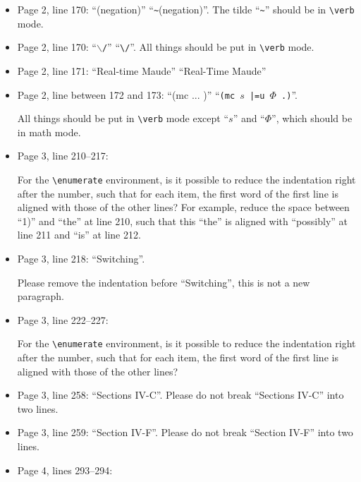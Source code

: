 \documentclass[12pt,onecolumn]{IEEEtranTIE}
\begin{document}
\begin{itemize}
All things should be put in \verb|\verb| mode except ``$s$'' and
``$\mathit{prop}$'', which should be in math mode. And please use the
macro \verb|\mathit{}| for ``$\mathit{prop}$''.

\item Page 2, line 170: ``(negation)'' \by ``\verb|~|(negation)''. The
  tilde ``\verb|~|'' should be in \verb|\verb| mode.

\item Page 2, line 170: ``$\backslash$\verb|/|'' \by ``\verb|\/|''. All
  things should be put in \verb|\verb| mode.

\item Page 2, line 171: ``Real-time Maude'' \by ``Real-Time Maude''

\item Page 2, line between 172 and 173: ``(mc ... )'' \by
  ``\verb|(mc |$s$\verb+ |=u +$\Phi$\verb| .)|''.

All things should be put in \verb|\verb| mode except ``$s$'' and
``$\Phi$'', which should be in math mode.

\item Page 3, line 210--217:

For the \verb|\enumerate| environment, is it possible to reduce the
indentation right after the number, such that for each item, the first
word of the first line is aligned with those of the other lines? For
example, reduce the space between ``1)'' and ``the'' at line 210, such
that this ``the'' is aligned with ``possibly'' at line 211 and ``is''
at line 212.

\item Page 3, line 218: ``Switching''.

Please remove the indentation before ``Switching'', this is not a new
paragraph.

\item Page 3, line 222--227:

For the \verb|\enumerate| environment, is it possible to reduce the
indentation right after the number, such that for each item, the first
word of the first line is aligned with those of the other lines? 

\item Page 3, line 258: ``Sections IV-C''. Please do not break
  ``Sections IV-C'' into two lines.

\item Page 3, line 259: ``Section IV-F''. Please do not break
  ``Section IV-F'' into two lines.

\item Page 4, lines 293--294:


\end{itemize}
\end{document}
